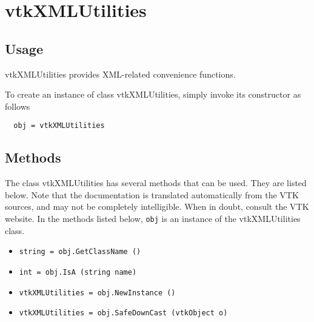 \section{vtkXMLUtilities}

\subsection{Usage}

 vtkXMLUtilities provides XML-related convenience functions.

To create an instance of class vtkXMLUtilities, simply
invoke its constructor as follows
\begin{verbatim}
  obj = vtkXMLUtilities
\end{verbatim}
\subsection{Methods}

The class vtkXMLUtilities has several methods that can be used.
  They are listed below.
Note that the documentation is translated automatically from the VTK sources,
and may not be completely intelligible.  When in doubt, consult the VTK website.
In the methods listed below, \verb|obj| is an instance of the vtkXMLUtilities class.
\begin{itemize}
\item  \verb|string = obj.GetClassName ()|

\item  \verb|int = obj.IsA (string name)|

\item  \verb|vtkXMLUtilities = obj.NewInstance ()|

\item  \verb|vtkXMLUtilities = obj.SafeDownCast (vtkObject o)|

\end{itemize}
